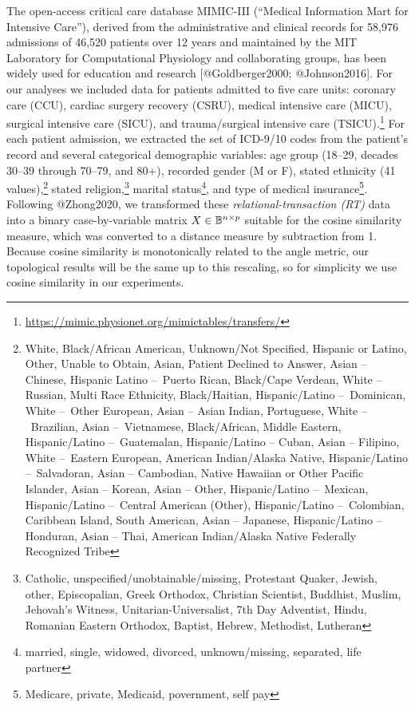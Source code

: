 \documentclass[
]{article}
\begin{document}
The open-access critical care database MIMIC-III (``Medical Information
Mart for Intensive Care''), derived from the administrative and clinical
records for 58,976 admissions of 46,520 patients over 12 years and
maintained by the MIT Laboratory for Computational Physiology and
collaborating groups, has been widely used for education and research
{[}@Goldberger2000; @Johnson2016{]}. For our analyses we included data
for patients admitted to five care units: coronary care (CCU), cardiac
surgery recovery (CSRU), medical intensive care (MICU), surgical
intensive care (SICU), and trauma/surgical intensive care
(TSICU).\footnote{\url{https://mimic.physionet.org/mimictables/transfers/}}
For each patient admission, we extracted the set of ICD-9/10 codes from
the patient's record and several categorical demographic variables: age
group (18--29, decades 30--39 through 70--79, and 80+), recorded gender
(M or F), stated ethnicity (41 values),\footnote{White, Black/African
  American, Unknown/Not Specified, Hispanic or Latino, Other, Unable to
  Obtain, Asian, Patient Declined to Answer, Asian -- Chinese, Hispanic
  Latino --~Puerto Rican, Black/Cape Verdean, White -- Russian, Multi
  Race Ethnicity, Black/Haitian, Hispanic/Latino --~Dominican, White
  --~Other European, Asian -- Asian Indian, Portuguese, White
  --~Brazilian, Asian --~Vietnamese, Black/African, Middle Eastern,
  Hispanic/Latino --~Guatemalan, Hispanic/Latino -- Cuban, Asian --
  Filipino, White --~Eastern European, American Indian/Alaska Native,
  Hispanic/Latino --~Salvadoran, Asian -- Cambodian, Native Hawaiian or
  Other Pacific Islander, Asian -- Korean, Asian -- Other,
  Hispanic/Latino --~Mexican, Hispanic/Latino --~Central American
  (Other), Hispanic/Latino --~Colombian, Caribbean Island, South
  American, Asian -- Japanese, Hispanic/Latino -- Honduran, Asian --
  Thai, American Indian/Alaska Native Federally Recognized Tribe} stated
religion,\footnote{Catholic, unspecified/unobtainable/missing,
  Protestant Quaker, Jewish, other, Episcopalian, Greek Orthodox,
  Christian Scientist, Buddhist, Muslim, Jehovah's Witness,
  Unitarian-Universalist, 7th Day Adventist, Hindu, Romanian Eastern
  Orthodox, Baptist, Hebrew, Methodist, Lutheran} marital
status\footnote{married, single, widowed, divorced, unknown/missing,
  separated, life partner}, and type of medical insurance\footnote{Medicare,
  private, Medicaid, povernment, self pay}. Following @Zhong2020, we
transformed these \emph{relational-transaction (RT)} data into a binary
case-by-variable matrix \(X \in \mathbb{B}^{n \times p}\) suitable for the
cosine similarity measure, which was converted to a distance measure by
subtraction from 1. Because cosine similarity is monotonically related
to the angle metric, our topological results will be the same up to this
rescaling, so for simplicity we use cosine similarity in our
experiments.
\end{document}

